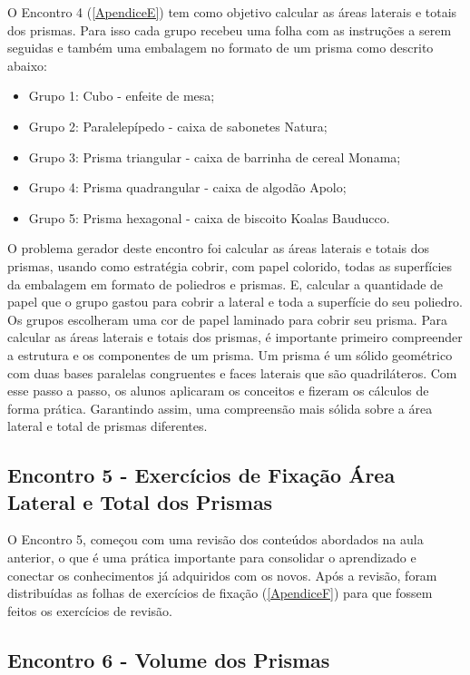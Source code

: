 O Encontro 4 (\autoref{ApendiceE}) tem como objetivo calcular as áreas laterais e totais dos prismas. Para isso cada grupo recebeu uma folha com as instruções a serem seguidas e também uma embalagem no formato de um prisma como descrito abaixo:

\begin{itemize}
    \item Grupo 1: Cubo - enfeite de mesa;
    \item Grupo 2: Paralelepípedo - caixa de sabonetes Natura;
    \item Grupo 3: Prisma triangular - caixa de barrinha de cereal Monama;
    \item Grupo 4: Prisma quadrangular - caixa de algodão Apolo;
    \item Grupo 5: Prisma hexagonal - caixa de biscoito Koalas Bauducco.
\end{itemize}

O problema gerador deste encontro foi calcular as áreas laterais e totais dos prismas, usando como estratégia cobrir, com papel colorido, todas as superfícies da embalagem em formato de poliedros e prismas. E, calcular a quantidade de papel que o grupo gastou para cobrir a lateral e toda a superfície do seu poliedro. Os grupos escolheram uma cor de papel laminado para cobrir seu prisma. Para calcular as áreas laterais e totais dos prismas, é importante primeiro compreender a estrutura e os componentes de um prisma. Um prisma é um sólido geométrico com duas bases paralelas congruentes e faces laterais que são quadriláteros. Com esse passo a passo, os alunos aplicaram os conceitos e fizeram os cálculos de forma prática. Garantindo assim, uma compreensão mais sólida sobre a área lateral e total de prismas diferentes.

\subsection{Encontro 5 - Exercícios de Fixação Área Lateral e Total dos Prismas}

O Encontro 5, começou com uma revisão dos conteúdos abordados na aula anterior, o que é uma prática importante para consolidar o aprendizado e conectar os conhecimentos já adquiridos com os novos. Após a revisão, foram distribuídas as folhas de exercícios de fixação (\autoref{ApendiceF}) para que fossem feitos os exercícios de revisão.

\subsection{Encontro 6 - Volume dos Prismas}

